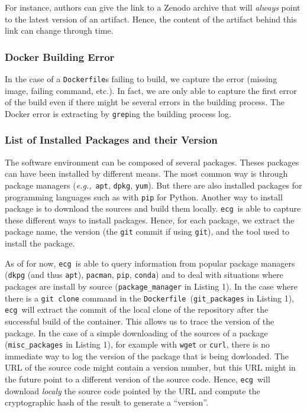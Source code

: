 \documentclass[sigconf,natbib=false]{acmart}
\newcommand{\eg}{\emph{e.g.,}}
\newcommand{\df}{\texttt{Dockerfile}}
\newcommand{\ecg}{\texttt{ecg}}
\begin{document}
For instance, authors can give the link to a Zenodo archive that will \emph{always} point to the latest version of an artifact.
Hence, the content of the artifact behind this link can change through time.

\subsubsection{Docker Building Error}

In the case of a \df s failing to build, we capture the error (missing image, failing command, etc.).
In fact, we are only able to capture the first error of the build even if there might be several errors in the building process.
The Docker error is extracting by \texttt{grep}ing the building process log.

\subsubsection{List of Installed Packages and their Version}

The software environment can be composed of several packages.
Theses packages can have been installed by different means.
The most common way is through package managers (\eg\ \texttt{apt}, \texttt{dpkg}, \texttt{yum}).
But there are also installed packages for programming languages such as with \texttt{pip} for Python.
Another way to install package is to download the sources and build them locally.
\ecg\ is able to capture these different ways to install packages.
Hence, for each package, we extract the package name, the version (the \texttt{git} commit if using \texttt{git}), and the tool used to install the package.

As of for now, \ecg\ is able to query information from popular package managers (\texttt{dkpg} (and thus \texttt{apt}), \texttt{pacman}, \texttt{pip}, \texttt{conda}) and to deal with situations where packages are install by source (\texttt{package\_manager} in Listing 1).
In the case where there is a \texttt{git clone} command in the \df\ (\texttt{git\_packages} in Listing 1), \ecg\ will extract the commit of the local clone of the repository after the successful build of the container.
This allows us to trace the version of the package.
In the case of a simple downloading of the sources of a package (\texttt{misc\_packages} in Listing 1), for example with \texttt{wget} or \texttt{curl}, there is no immediate way to log the version of the package that is being dowloaded.
The URL of the source code might contain a version number, but this URL might in the future point to a different version of the source code.
Hence, \ecg\ will download \emph{localy} the source code pointed by the URL and compute the cryptographic hash of the result to generate a ``version''.
\end{document}
